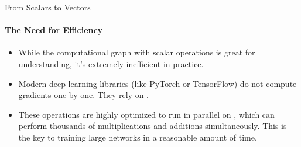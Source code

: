 \begin{frame}{From Scalars to Vectors}
    \framesubtitle{The Need for Efficiency}
    \begin{itemize}
        \item While the computational graph with scalar operations is great for understanding, it's extremely inefficient in practice.
        \item Modern deep learning libraries (like PyTorch or TensorFlow) do not compute gradients one by one. They rely on .
        \item These operations are highly optimized to run in parallel on , which can perform thousands of multiplications and additions simultaneously. This is the key to training large networks in a reasonable amount of time.
    \end{itemize}
\end{frame}

